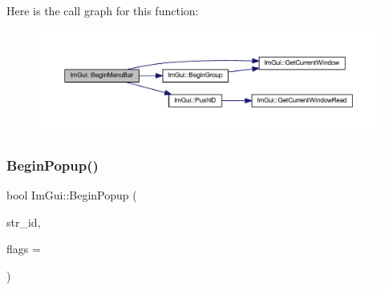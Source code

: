 Here is the call graph for this function\+:
\nopagebreak
\begin{figure}[H]
\begin{center}
\leavevmode
\includegraphics[width=350pt]{namespace_im_gui_a4852dff802922163fc747e2e0df5b88f_cgraph}
\end{center}
\end{figure}
\mbox{\label{namespace_im_gui_a10e213926d8ca212266bc5fbded1e026}} 
\subsubsection{\texorpdfstring{Begin\+Popup()}{BeginPopup()}}
{\footnotesize\ttfamily bool Im\+Gui\+::\+Begin\+Popup (\begin{DoxyParamCaption}\item[{const char $\ast$}]{str\+\_\+id,  }\item[{\mbox{\hyperlink{imgui_8h_a0b8e067ab4f7a818828c8d89e531addc}{Im\+Gui\+Window\+Flags}}}]{flags = {} }\end{DoxyParamCaption})}


